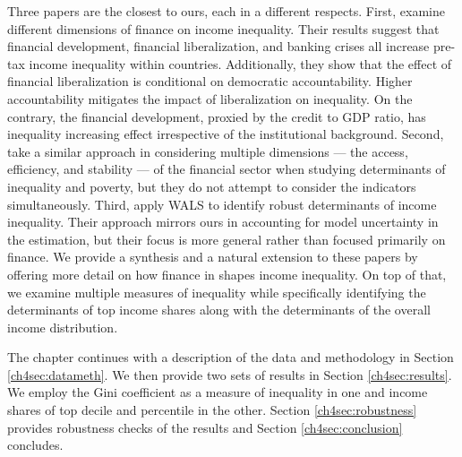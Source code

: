 \begin{refsection}
Three papers are the closest to ours, each in a different respects. First, \textcite{de2017finance} examine different dimensions of finance on income inequality. Their results suggest that financial development, financial liberalization, and banking crises all increase pre-tax income inequality within countries. Additionally, they show that the effect of financial liberalization is conditional on democratic accountability. Higher accountability mitigates the impact of liberalization on inequality. On the contrary, the financial development, proxied by the credit to GDP ratio, has inequality increasing effect irrespective of the institutional background. Second, \textcite{naceurzhang2016} take a similar approach in considering multiple dimensions --- the access, efficiency, and stability --- of the financial sector when studying determinants of inequality and poverty, but they do not attempt to consider the indicators simultaneously.  Third, \textcite{furceri2019robust} apply \ac{WALS} to identify robust determinants of income inequality. Their approach mirrors ours in accounting for model uncertainty in the estimation, but their focus is more general rather than focused primarily on finance. We provide a synthesis and a natural extension to these papers by offering more detail on how finance in shapes income inequality. On top of that, we examine multiple measures of inequality while specifically identifying the determinants of top income shares along with the determinants of the overall income distribution.

The chapter continues with a description of the data and methodology in Section \ref{ch4sec:datameth}. We then provide two sets of results in Section \ref{ch4sec:results}. We employ the Gini coefficient as a measure of inequality in one and income shares of top decile and percentile in the other. Section \ref{ch4sec:robustness} provides robustness checks of the results and Section \ref{ch4sec:conclusion} concludes.



\end{refsection}
